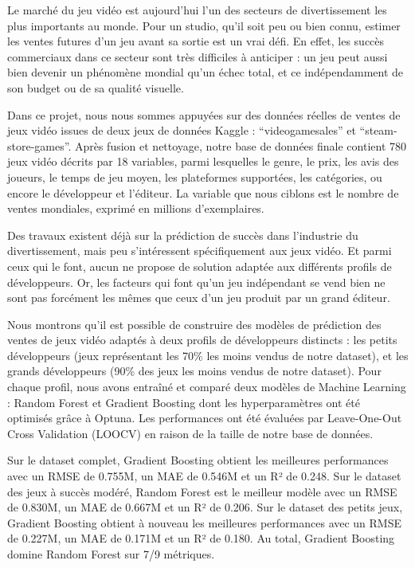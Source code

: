 \documentclass[mstat,12pt]{unswthesis}
\begin{document}



Le marché du jeu vidéo est aujourd'hui l'un des secteurs de divertissement les plus importants au monde. Pour un studio, qu'il soit peu ou bien connu, estimer les ventes futures d'un jeu avant sa sortie est un vrai défi. En effet, les succès commerciaux dans ce secteur sont très difficiles à anticiper : un jeu peut aussi bien devenir un phénomène mondial qu'un échec total, et ce indépendamment de son budget ou de sa qualité visuelle.

Dans ce projet, nous nous sommes appuyées sur des données réelles de ventes de jeux vidéo issues de deux jeux de données Kaggle : “videogamesales” et “steam-store-games”. Après fusion et nettoyage, notre base de données finale contient 780 jeux vidéo décrits par 18 variables, parmi lesquelles le genre, le prix, les avis des joueurs, le temps de jeu moyen, les plateformes supportées, les catégories, ou encore le développeur et l'éditeur. La variable que nous ciblons est le nombre de ventes mondiales, exprimé en millions d'exemplaires.

Des travaux existent déjà sur la prédiction de succès dans l'industrie du divertissement, mais peu s'intéressent spécifiquement aux jeux vidéo. Et parmi ceux qui le font, aucun ne propose de solution adaptée aux différents profils de développeurs. Or, les facteurs qui font qu'un jeu indépendant se vend bien ne sont pas forcément les mêmes que ceux d'un jeu produit par un grand éditeur.

Nous montrons qu'il est possible de construire des modèles de prédiction des ventes de jeux vidéo adaptés à deux profils de développeurs distincts : les petits développeurs (jeux représentant les 70\% les moins vendus de notre dataset), et les grands développeurs (90\% des jeux les moins vendus de notre dataset). Pour chaque profil, nous avons entraîné et comparé deux modèles de Machine Learning : Random Forest et Gradient Boosting dont les hyperparamètres ont été optimisés grâce à Optuna. Les performances ont été évaluées par Leave-One-Out Cross Validation (LOOCV) en raison de la taille de notre base de données.

Sur le dataset complet, Gradient Boosting obtient les meilleures performances avec un RMSE de 0.755M, un MAE de 0.546M et un R² de 0.248. Sur le dataset des jeux à succès modéré, Random Forest est le meilleur modèle avec un RMSE de 0.830M, un MAE de 0.667M et un R² de 0.206. Sur le dataset des petits jeux, Gradient Boosting obtient à nouveau les meilleures performances avec un RMSE de 0.227M, un MAE de 0.171M et un R² de 0.180. Au total, Gradient Boosting domine Random Forest sur 7/9 métriques.
\end{document}

